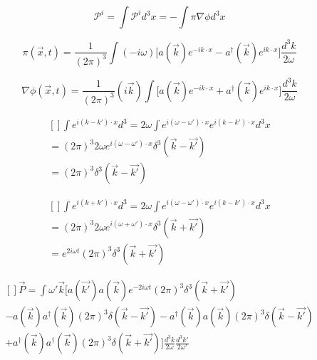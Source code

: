 \documentclass{article}
\begin{document}
    \begin{equation}
        \mathcal{P}^{i} = \int \mathcal{P}^{i} d^{3} x = - \int \pi \nabla \phi d^{3} x
    \end{equation}

    \begin{equation}
        \pi (\vec{x}, t) = \frac{1}{(2 \pi)^3} \int (- i \omega) \Big[ a(\vec{k}) e^{-i k \cdot x} - a^{\dag}(\vec{k}) e^{i k \cdot x} \Big] \frac{d^3k}{2 \omega}
    \end{equation}

    \begin{equation}
        \nabla \phi (\vec{x}, t) = \frac{1}{(2 \pi)^3} (i \vec{k}) \int \Big[ a(\vec{k}) e^{-i k \cdot x} + a^{\dag}(\vec{k}) e^{i k \cdot x} \Big] \frac{d^3k}{2 \omega}
    \end{equation}

    \begin{equation}
        \begin{aligned}[]
            \int e^{i (k - k') \cdot x} d^{3} = 2 \omega \int e^{i (\omega - \omega') \cdot x} e^{i (k - k') \cdot x} d^{3} x  \\
            = (2 \pi)^{3} 2 \omega e^{i (\omega - \omega') \cdot x} \delta^{3} (\vec{k} - \vec{k'}) \\
            = (2 \pi)^3 \delta^{3} (\vec{k} - \vec{k'})
        \end{aligned}
    \end{equation}

    \begin{equation}
        \begin{aligned}[]
            \int e^{i (k + k') \cdot x} d^{3} = 2 \omega \int e^{i (\omega - \omega') \cdot x} e^{i (k - k') \cdot x} d^{3} x  \\
            = (2 \pi)^{3} 2 \omega e^{i (\omega + \omega') \cdot x} \delta^{3} (\vec{k} + \vec{k'}) \\
            = e^{2 i \omega t} (2 \pi)^3 \delta^{3} (\vec{k} + \vec{k'})
        \end{aligned}
    \end{equation}

    \begin{equation}
        \begin{aligned}[]
            \vec{P} = \int \omega' \vec{k} [ a (\vec{k'}) a (\vec{k}) e^{- 2 i \omega t} (2 \pi)^{3} \delta^{3} (\vec{k} + \vec{k'}) \\
            - a (\vec{k}) a^{\dag} (\vec{k}) (2 \pi)^{3} \delta(\vec{k} - \vec{k'}) - a^{\dag} (\vec{k}) a (\vec{k}) (2 \pi)^{3} \delta(\vec{k} - \vec{k'}) \\
            + a^{\dag} (\vec{k}) a^{\dag} (\vec{k}) (2 \pi)^{3} \delta(\vec{k} + \vec{k'})] \frac{d^3k}{2 \omega} \frac{d^3k'}{2 \omega'}
        \end{aligned}
    \end{equation}
\end{document}

